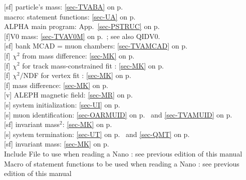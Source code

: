  [sf] particle's mass: \ref{sec-TVABA} on p.~\pageref{sec-TVABA}\\
 macro: statement functions: \ref{sec-UA} on p.~\pageref{sec-UA}\\
 ALPHA main program: App.~\ref{sec-PSTRUC} on p.~\pageref{sec-PSTRUC}\\
 [f]V0 mass: \ref{sec-TVAV0M} on p.~\pageref{sec-TVAV0M}; see also QIDV0.\\
 [sf] bank MCAD = muon chambers: \ref{sec-TVAMCAD} on p.~\pageref{sec-TVAMCAD}\\
 [f] $\chi^2$ from mass difference: \ref{sec-MK} on
 p.~\pageref{sec-MK}\\
 [f] $\chi^2$ for track mass-constrained fit : \ref{sec-MK} on
 p.~\pageref{sec-MK}\\
 [f] $\chi^2/$NDF for vertex fit : \ref{sec-MK} on
 p.~\pageref{sec-MK}\\
 [f] mass difference: \ref{sec-MK} on
 p.~\pageref{sec-MK}\\
 [v] ALEPH magnetic field: \ref{sec-MR} on p.~\pageref{sec-MR}\\
 [s] system initialization: \ref{sec-UI} on p.~\pageref{sec-UI}\\
 [s] muon identification: \ref{sec-OARMUID} on p.~\pageref{sec-OARMUID} and
 \ref{sec-TVAMUID} on p.~\pageref{sec-TVAMUID}\\
 [sf] invariant mass$^2$: \ref{sec-MK} on p.~\pageref{sec-MK}\\
 [s] system termination:
 \ref{sec-UT} on p.~\pageref{sec-UT} and \ref{sec-QMT} on p.~\pageref{sec-QMT}\\
 [sf] invariant mass: \ref{sec-MK} on p.~\pageref{sec-MK}\\
 Include File to use when reading a Nano :
      see previous edition of this manual\\
 Macro of statement functions to be used when reading a Nano :
      see previous edition of this manual
 
